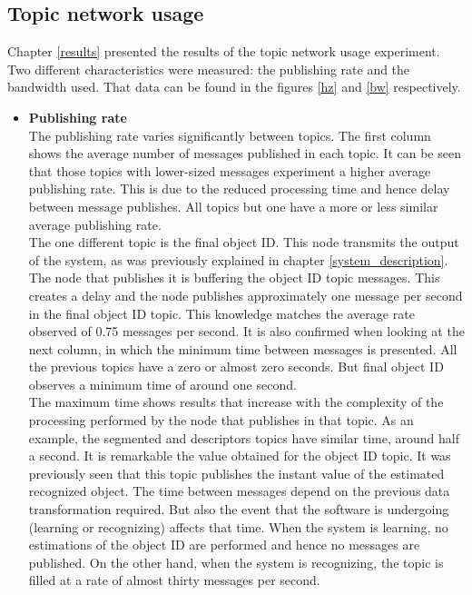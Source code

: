 		\subsection{Topic network usage}

			Chapter \ref{results} presented the results of the topic network usage experiment. 
			Two different characteristics were measured: the publishing rate and the bandwidth used. 
			That data can be found in the figures \ref{hz} and \ref{bw} respectively. 
			\\

			\begin{itemize}
				\item{\textbf{Publishing rate}}\\

			The publishing rate varies significantly between topics. 
			The first column shows the average number of messages published in each topic. 
			It can be seen that those topics with lower-sized messages experiment a higher average publishing rate. 
			This is due to the reduced processing time and hence delay between message publishes. 
			All topics but one have a more or less similar average publishing rate. 
			\\

			The one different topic is the final object ID. 
			This node transmits the output of the system, as was previously explained in chapter \ref{system_description}.
			The node that publishes it is buffering the object ID topic messages. 
			This creates a delay and the node publishes approximately one message per second in the final object ID topic. 
			This knowledge matches the average rate observed of 0.75 messages per second. 
			It is also confirmed when looking at the next column, in which the minimum time between messages is presented. 
			All the previous topics have a zero or almost zero seconds. 
			But final object ID observes a minimum time of around one second. 
			\\

			The maximum time shows results that increase with the complexity of the processing performed by the node that publishes in that topic. 
			As an example, the segmented and descriptors topics have similar time, around half a second. 
			It is remarkable the value obtained for the object ID topic. 
			It was previously seen that this topic publishes the instant value of the estimated recognized object. 
			The time between messages depend on the previous data transformation required. 
			But also the event that the software is undergoing (learning or recognizing) affects that time. 
			When the system is learning, no estimations of the object ID are performed and hence no messages are published. 
			On the other hand, when the system is recognizing, the topic is filled at a rate of almost thirty messages per second. 
			\\


\end{itemize}
